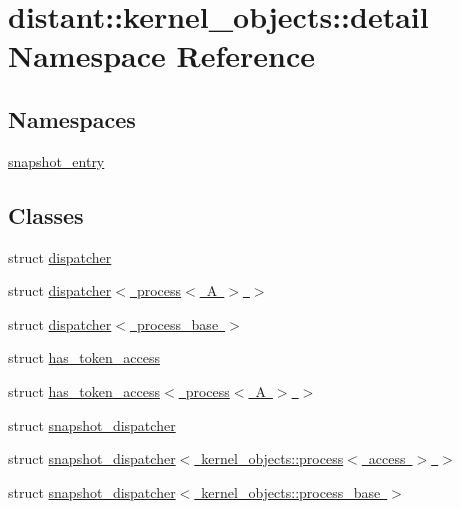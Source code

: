 \hypertarget{namespacedistant_1_1kernel__objects_1_1detail}{}\section{distant\+:\+:kernel\+\_\+objects\+:\+:detail Namespace Reference}
\label{namespacedistant_1_1kernel__objects_1_1detail}
\subsection*{Namespaces}
\begin{DoxyCompactItemize}
\item 
 \mbox{\hyperlink{namespacedistant_1_1kernel__objects_1_1detail_1_1snapshot__entry}{snapshot\+\_\+entry}}
\end{DoxyCompactItemize}
\subsection*{Classes}
\begin{DoxyCompactItemize}
\item 
struct \mbox{\hyperlink{structdistant_1_1kernel__objects_1_1detail_1_1dispatcher}{dispatcher}}
\item 
struct \mbox{\hyperlink{structdistant_1_1kernel__objects_1_1detail_1_1dispatcher_3_01process_3_01_a_01_4_01_4}{dispatcher$<$ process$<$ A $>$ $>$}}
\item 
struct \mbox{\hyperlink{structdistant_1_1kernel__objects_1_1detail_1_1dispatcher_3_01process__base_01_4}{dispatcher$<$ process\+\_\+base $>$}}
\item 
struct \mbox{\hyperlink{structdistant_1_1kernel__objects_1_1detail_1_1has__token__access}{has\+\_\+token\+\_\+access}}
\item 
struct \mbox{\hyperlink{structdistant_1_1kernel__objects_1_1detail_1_1has__token__access_3_01process_3_01_a_01_4_01_4}{has\+\_\+token\+\_\+access$<$ process$<$ A $>$ $>$}}
\item 
struct \mbox{\hyperlink{structdistant_1_1kernel__objects_1_1detail_1_1snapshot__dispatcher}{snapshot\+\_\+dispatcher}}
\item 
struct \mbox{\hyperlink{structdistant_1_1kernel__objects_1_1detail_1_1snapshot__dispatcher_3_01kernel__objects_1_1process_3_01access_01_4_01_4}{snapshot\+\_\+dispatcher$<$ kernel\+\_\+objects\+::process$<$ access $>$ $>$}}
\item 
struct \mbox{\hyperlink{structdistant_1_1kernel__objects_1_1detail_1_1snapshot__dispatcher_3_01kernel__objects_1_1process__base_01_4}{snapshot\+\_\+dispatcher$<$ kernel\+\_\+objects\+::process\+\_\+base $>$}}
\end{DoxyCompactItemize}
